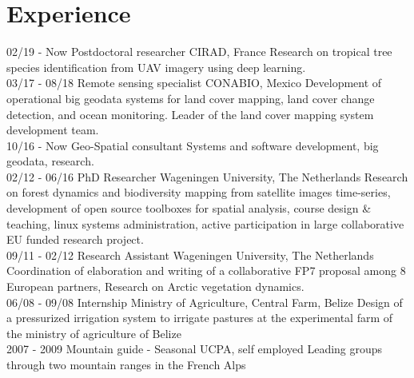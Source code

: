 \documentclass[]{friggeri-cv}
\begin{document}
\section{Experience}
\begin{entrylist}

  \entry
    {02/19 - Now}
    {Postdoctoral researcher}
    {CIRAD, France}
    {Research on tropical tree species identification from UAV imagery using deep learning.\\}
  \entry
    {03/17 - 08/18}
    {Remote sensing specialist}
    {CONABIO, Mexico}
    {Development of operational big geodata systems for land cover mapping, land cover change detection, and ocean monitoring. Leader of the land cover mapping system development team.\\}
  \entry
    {10/16 - Now}
    {Geo-Spatial consultant}
    {}
    {Systems and software development, big geodata, research.\\}
  \entry
    {02/12 - 06/16}
    {PhD Researcher}
    {Wageningen University, The Netherlands}
    {Research on forest dynamics and biodiversity mapping from satellite images time-series, development of open source toolboxes for spatial analysis, course design \& teaching, linux systems administration, active participation in large collaborative EU funded research project.\\}
  \entry
    {09/11 - 02/12}
    {Research Assistant}
    {Wageningen University, The Netherlands}
    {Coordination of elaboration and writing of a collaborative FP7 proposal among 8 European partners, Research on Arctic vegetation dynamics.\\}
  \entry
    {06/08 - 09/08}
    {Internship}
    {Ministry of Agriculture, Central Farm, Belize}
    {Design of a pressurized irrigation system to irrigate pastures at the experimental farm of the ministry of agriculture of Belize\\}
  \entry
    {2007 - 2009}
    {Mountain guide - Seasonal}
    {UCPA, self employed}
    {Leading groups through two mountain ranges in the French Alps}
\end{entrylist}
\end{document}
